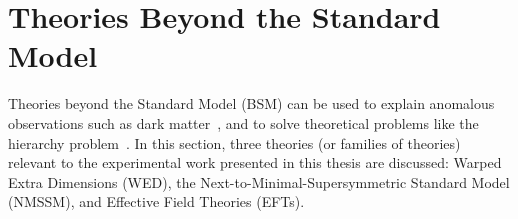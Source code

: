 \section{Theories Beyond the Standard Model}\label{sec:bsm}
Theories beyond the Standard Model (BSM) can be used to explain anomalous observations such as dark matter~\cite{Clowe:2006eq}, and to solve theoretical problems like the hierarchy problem~\cite{Thomson:2013zua}. In this section, three theories (or families of theories) relevant to the experimental work presented in this thesis are discussed: Warped Extra Dimensions (WED), the Next-to-Minimal-Supersymmetric Standard Model (NMSSM), and Effective Field Theories (EFTs).



\newpage
